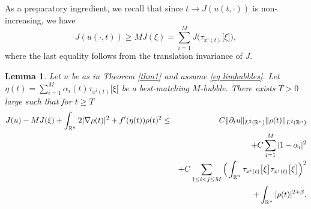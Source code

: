 \documentclass[11pt,letterpaper,reqno]{amsart}
\newcommand{\R}{\mathbb{R}}
\theoremstyle{plain}%
\newtheorem{lemma}[theorem]{Lemma}
\theoremstyle{definition}
\numberwithin{equation}{section}
\numberwithin{figure}{section}
\begin{document}
As a preparatory ingredient, we recall that since $t\to J(u( t, \cdot))$ is non-increasing, we have
 \begin{equation}\label{eq bee}
     J(u(\cdot, t)) \geq M J(\xi) = \sum_{i=1}^M J\big(\tau_{x^i(t)}\big[\xi\big]\big),
 \end{equation}   
 where the last equality follows from the translation invariance of $J$.

\begin{lemma}\label{lemma difMbubble}
    Let $u$ be as in Theorem \ref{thm1} and assume \eqref{eq limbubbles}. Let $\eta(t) = \sum_{i=1}^M \alpha_i(t) \tau_{x^i(t)}\big[\xi\big]$ be a best-matching $M$-bubble. There exists $T>0$ large such that for $t\geq T$
    \begin{eqnarray}\notag
J(u)- MJ(\xi)+\int_{\R^n}  2|\nabla \rho(t)|^2 + f'(\eta(t)) \rho(t)^2&\leq& C\Vert \partial_t u\Vert_{L^2(\R^n)} \Vert \rho(t)\Vert_{L^2(\R^n)}\\\notag
&&+C\sum_{i=1}^M |1-\alpha_i|^2\\\notag
&&+C\sum_{1\leq i <j\leq M} \Big(\int_{\R^n}\tau_{x^i(t)}\big[\xi\big]\tau_{x^j(t)}\big[\xi\big]\Big)^2\\\label{eq keyestimate}
	&&+\int_{\R^n}|\rho(t)|^{2+\beta},
\end{eqnarray}
\end{lemma}
\end{document}
